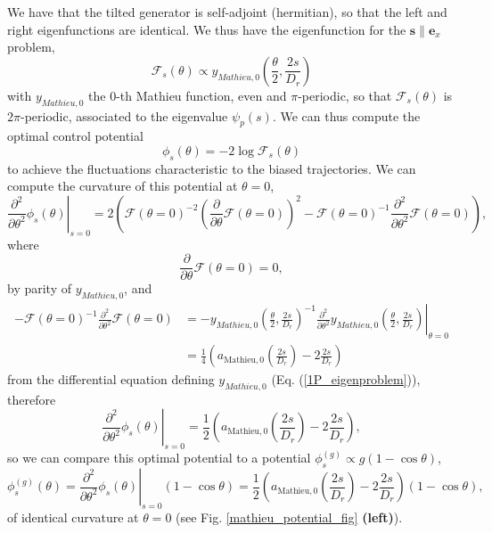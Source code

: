 \documentclass[pre,aps,superscriptaddress,nofootinbib]{revtex4}
\begin{document}
We have that the tilted generator is self-adjoint (hermitian), so that the left and right eigenfunctions are identical. We thus have the eigenfunction for the $\bm{s} \parallel \bm{e}_x$ problem,
\begin{equation}
\mathcal{F}_s(\theta) \propto y_{Mathieu, 0}\left(\frac{\theta}{2}, \frac{2s}{D_r}\right)
\end{equation}
with $y_{Mathieu, 0}$ the $0$-th Mathieu function, even and $\pi$-periodic, so that $\mathcal{F}_s(\theta)$ is $2\pi$-periodic, associated to the eigenvalue $\psi_{p}(s)$. We can thus compute the optimal control potential \cite{jack2019ergodicity}
\begin{equation}
\phi_s(\theta) = - 2 \log \mathcal{F}_s(\theta)
\label{control_potential}
\end{equation}
to achieve the fluctuations characteristic to the biased trajectories. We can compute the curvature of this potential at $\theta = 0$,
\begin{equation}
\left. \frac{\partial^2}{\partial \theta^2} \phi_s(\theta) \right|_{s=0} = 2 \left(\mathcal{F}(\theta = 0)^{-2} \left(\frac{\partial}{\partial \theta} \mathcal{F}(\theta = 0)\right)^2 - \mathcal{F}(\theta = 0)^{-1}\frac{\partial^2}{\partial\theta^2} \mathcal{F}(\theta = 0)\right),
\end{equation}
where
\begin{equation}
\frac{\partial}{\partial \theta} \mathcal{F}(\theta = 0) = 0,
\end{equation}
by parity of $y_{Mathieu, 0}$, and
\begin{equation}
\begin{aligned}
- \mathcal{F}(\theta = 0)^{-1}\frac{\partial^2}{\partial\theta^2} \mathcal{F}(\theta = 0) &= \left. - y_{Mathieu, 0}\left(\frac{\theta}{2}, \frac{2s}{D_r}\right)^{-1}\frac{\partial^2}{\partial\theta^2} y_{Mathieu, 0}\left(\frac{\theta}{2}, \frac{2s}{D_r}\right) \right|_{\theta=0}\\
&= \frac{1}{4} \left(a_{\mathrm{Mathieu}, 0}\left(\frac{2s}{D_r}\right) - 2 \frac{2s}{D_r}\right)
\end{aligned}
\end{equation}
from the differential equation defining $y_{Mathieu, 0}$ (Eq. (\ref{1P_eigenproblem})), therefore
\begin{equation}
\left. \frac{\partial^2}{\partial \theta^2} \phi_s(\theta) \right|_{s=0} = \frac{1}{2} \left(a_{\mathrm{Mathieu}, 0}\left(\frac{2s}{D_r}\right) - 2 \frac{2s}{D_r}\right),
\end{equation}
so we can compare this optimal potential to a potential $\phi^{(g)}_s \propto g (1 - \cos\theta)$,
\begin{equation}
\phi^{(g)}_s(\theta) = \left. \frac{\partial^2}{\partial \theta^2} \phi_s(\theta) \right|_{s=0} (1 - \cos\theta) = \frac{1}{2} \left(a_{\mathrm{Mathieu}, 0}\left(\frac{2s}{D_r}\right) - 2 \frac{2s}{D_r}\right) (1 - \cos\theta),
\end{equation}
of identical curvature at $\theta = 0$ (see Fig. \ref{mathieu_potential_fig} \textbf{(left)}).
\end{document}
